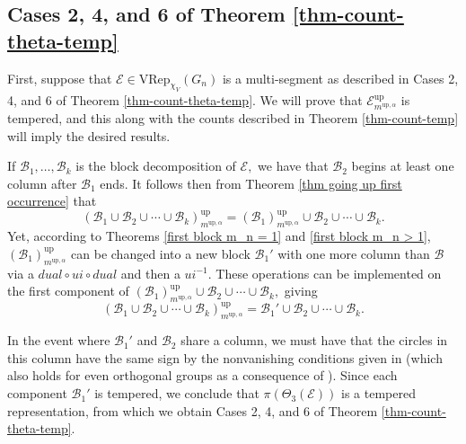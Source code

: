 \documentclass[11pt,letterpaper]{amsart}
\newcommand{\VRep}{{\mathrm{VRep}}}
\newcommand{\up}{{\mathrm{up}}}
\numberwithin{equation}{section}
\begin{document}
\subsection{Cases 2, 4, and 6 of Theorem \ref{thm-count-theta-temp}}\label{sec Cases 1, 2, 4}

First, suppose that $\mathcal{E}\in\VRep_{\chi_V}(G_n)$ is a multi-segment as described in Cases 2, 4, and 6 of Theorem \ref{thm-count-theta-temp}. We will prove that $\mathcal{E}_{m^{\up, \alpha}}^\up$ is tempered, and this along with the counts described in Theorem \ref{thm-count-temp} will imply the desired results.

If $\mathcal{B}_1, \dots, \mathcal{B}_k$ is the block decomposition of $\mathcal{E},$ we have that $\mathcal{B}_2$ begins at least one column after $\mathcal{B}_1$ ends. It follows then from Theorem \ref{thm going up first occurrence} that
$$(\mathcal{B}_1 \cup \mathcal{B}_2 \cup \cdots \cup \mathcal{B}_k)_{m^{\up, \alpha}}^\up = (\mathcal{B}_1)_{m^{\up, \alpha}}^\up \cup \mathcal{B}_2 \cup \cdots \cup \mathcal{B}_k.$$ Yet, according to Theorems \ref{first block m_n = 1} and \ref{first block m_n > 1}, $(\mathcal{B}_1)_{m^{\up, \alpha}}^\up$ can be changed into a new block $\mathcal{B}_1'$ with one more column than $\mathcal{B}$ via a $dual \circ ui \circ dual$ and then a $ui^{-1}.$ These operations can be implemented on the first component of $(\mathcal{B}_1)_{m^{\up, \alpha}}^\up \cup \mathcal{B}_2 \cup \cdots \cup \mathcal{B}_k,$ giving
$$(\mathcal{B}_1 \cup \mathcal{B}_2 \cup \cdots \cup \mathcal{B}_k)_{m^{\up, \alpha}}^\up = \mathcal{B}_1' \cup \mathcal{B}_2 \cup \cdots \cup \mathcal{B}_k.$$

In the event where $\mathcal{B}_1'$ and $\mathcal{B}_2$ share a column, we must have that the circles in this column have the same sign by the nonvanishing conditions given in \cite[Theorems 3.6, 4.4]{Ato20b} (which also holds for even orthogonal groups as a consequence of \cite[Theorem 6.8]{HLL25}). Since each component $\mathcal{B}_1'$ is tempered, we conclude that $\pi(\Theta_3(\mathcal{E}))$ is a tempered representation, from which we obtain Cases 2, 4, and 6 of Theorem \ref{thm-count-theta-temp}.
\end{document}
